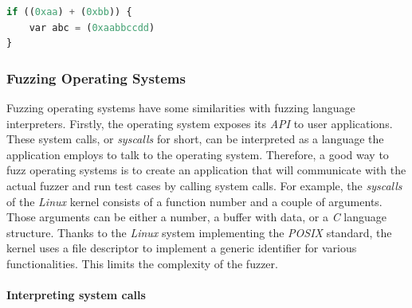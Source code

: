 \pagebreak
\begin{minipage}{\linewidth}
\begin{lstlisting}[language=python,caption={Generated program from syntax tree.},label={lst:gensrc}]
if ((0xaa) + (0xbb)) {
    var abc = (0xaabbccdd)
}    
\end{lstlisting}    
\end{minipage}


\subsubsection{Fuzzing Operating Systems}

Fuzzing operating systems have some similarities with fuzzing language interpreters. Firstly, the operating system exposes its \textit{API} to user applications. These system calls, or \textit{syscalls} for short, can be interpreted as a language the application employs to talk to the operating system. Therefore, a good way to fuzz operating systems is to create an application that will communicate with the actual fuzzer and run test cases by calling system calls. For example, the \textit{syscalls} of the \textit{Linux} kernel consists of a function number and a couple of arguments. Those arguments can be either a number, a buffer with data, or a \textit{C} language structure. Thanks to the \textit{Linux} system implementing the \textit{POSIX} standard, the kernel uses a file descriptor to implement a generic identifier for various functionalities. This limits the complexity of the fuzzer. 

\paragraph{Interpreting system calls}
 
